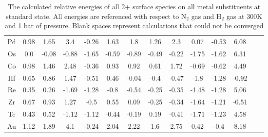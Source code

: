 \documentclass[journal=jacsat,manuscript=article]{achemso}
\begin{document}
\begin{table}
\begin{center}
\begin{tabular}{| c | c | c | c | c | c | c | c | c | c | c | c | c | c |}
Pd & 0.98 & 1.65 & 3.4 & -0.26 & 1.63 & 1.8 & 1.26 & 2.3 & 0.07 & -0.53 & 6.08 \\
Os & 0.0 & -0.08 & -0.88 & -1.65 & -0.59 & -0.89 & -0.49 & -0.22 & -1.75 & -1.62 & 6.31 \\
Co & 0.98 & 1.46 & 2.48 & -0.36 & 0.93 & 0.92 & 0.61 & 1.72 & -0.69 & -0.62 & 4.49 \\
Hf & 0.65 & 0.86 & 1.47 & -0.51 & 0.46 & -0.04 & -0.4 & -0.47 & -1.8 & -1.28 & -0.92 \\
Re & 0.35 & 0.26 & -1.69 & -1.28 & -0.8 & -0.54 & -0.25 & -0.35 & -1.48 & -1.28 & 5.06 \\
Zr & 0.67 & 0.93 & 1.27 & -0.5 & 0.55 & 0.09 & -0.25 & -0.34 & -1.64 & -1.21 & -0.51 \\
Tc & 0.43 & 0.52 & -1.12 & -1.12 & -0.44 & -0.19 & 0.19 & -0.41 & -1.71 & -1.23 & 4.58 \\
Au & 1.12 & 1.89 & 4.1 & -0.24 & 2.04 & 2.22 & 1.6 & 2.75 & 0.42 & -0.4 & 8.18 \\
\hline
\end{tabular}
\end{center}
\caption{The calculated relative energies of all 2+ surface species on all metal substituents at standard state. All energies are referenced with respect to N$_2$ gas and H$_2$ gas at 300K and 1 bar of pressure. Blank spaces represent calculations that could not be converged}
\label{table:energies}
\end{table}
\end{document}

